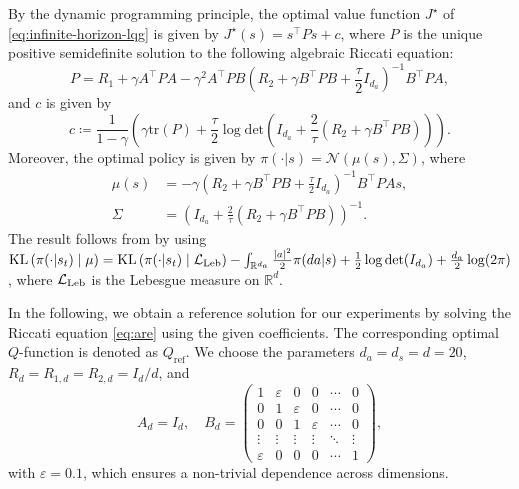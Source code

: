 \documentclass[11pt]{article}
\numberwithin{equation}{section}
\theoremstyle{definition}
\theoremstyle{remark}
\def\R{{\mathbb R}}
\newcommand{\citet}{\cite}
\begin{document}
By the   dynamic programming principle, 
the optimal value function $J^\star$ of \eqref{eq:infinite-horizon-lqg} is given by $J^\star(s) = s^\top P s + c$,
where $P$ is the unique positive semidefinite solution to  the following algebraic Riccati equation:
\begin{equation}
	\label{eq:are}
	P = R_1 + \gamma A^\top P A - \gamma^2 A^\top P B \left(R_2 + \gamma B^\top P B + \frac{\tau}{2}I_{d_a}\right)^{-1}B^\top P A,
\end{equation}
and $c$ is given by 
\begin{equation}
	\label{eq:c-infinite-horizon-lqg}
	c \coloneqq  \frac{1}{1-\gamma} \left( \gamma \mathrm{tr}(P) + \frac{\tau}{2}\log \mathrm{det}\left( I_{d_a} + \frac{2}{\tau}(R_2 + \gamma B^\top P B) \right) \right).
\end{equation}
Moreover, the optimal policy is given by $\pi(\cdot | s) = \mathcal N (\mu(s), \Sigma)$, where
\begin{equation}
	\label{eq:optimal-policy-infinite-lqg}
	\begin{aligned}
		\mu(s) &= -\gamma \left(R_2 + \gamma B^\top P B + \frac{\tau}{2} I_{d_a}\right)^{-1}B^\top P A s, \\
		\Sigma &= \left(I_{d_a} + \frac{2}{\tau} (R_2 + \gamma B^\top P B)\right)^{-1}.	
	\end{aligned}
\end{equation}
The result follows   from \citet{guo2023fastpolicylearninglinear} by using 
$ \mathrm{KL}\left(\pi(\cdot | s_t) \mid \mu\right) 
=\mathrm{KL} \left(\pi(\cdot | s_t) \mid \mathcal L_{\rm Leb}\right)
-\int_{\R^{d_a}} 
\frac{|a|^2}{2} 
\pi(d a|s)+
\frac{1}{2}\log \mathrm{det} (I_{d_a})
+\frac{d_a}{2} \log (2\pi)
$, where $ \mathcal L_{\rm Leb}$ is the Lebesgue measure on $\R^d$.

 


In the following, we obtain a reference solution for our experiments by solving the Riccati equation \eqref{eq:are} using the given coefficients. The corresponding optimal \( Q \)-function is denoted as \( Q_{\mathrm{ref}} \).  We choose the parameters    $d_a = d_s = d = 20$, 
$R_d = R_{1,d} = R_{2,d} = I_d / d$,
and 
\[
    A_d = I_d, \quad  B_d = \begin{pmatrix}
        1        & \varepsilon & 0        & 0        & \cdots & 0      \\
        0        & 1        & \varepsilon & 0        & \cdots & 0      \\
        0        & 0        & 1        & \varepsilon & \cdots & 0      \\
        \vdots   & \vdots   & \vdots   & \vdots   & \ddots & \vdots \\
        \varepsilon & 0        & 0        & 0        & \cdots & 1
    \end{pmatrix},
\]
with $\varepsilon = 0.1$,
which ensures  a non-trivial dependence across dimensions.
 
\end{document}
